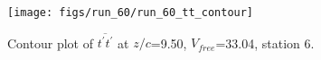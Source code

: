 \begin{figure}[H]
\centering
\texttt{[image: figs/run\_60/run\_60\_tt\_contour]}
\caption{Contour plot of $\overline{t^\prime t^\prime}$ at $z/c$=9.50, $V_{free}$=33.04, station 6.}
\label{fig:run_60_tt_contour}
\end{figure}



